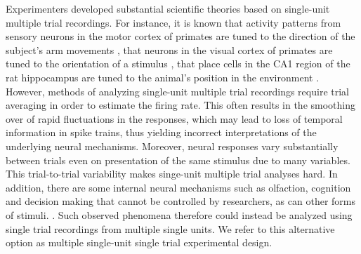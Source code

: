 Experimenters developed substantial scientific theories based on single-unit 
multiple trial recordings. For instance, it is known that activity patterns from sensory neurons in the motor cortex of primates are tuned to the direction of the subject's arm movements \cite{Georgopoulos1982}, that neurons in the visual cortex of primates are tuned to the orientation of a stimulus \cite{Hubel1968}, that place cells in the CA1 region of the rat hippocampus are tuned to the animal's position in the environment \cite{OKeefe1971}. However, methods of analyzing single-unit multiple trial recordings require trial averaging in order to estimate the firing rate. This often results in the smoothing over of rapid fluctuations in the responses, which may lead to loss of temporal information in spike trains, thus yielding incorrect interpretations of the underlying neural mechanisms. Moreover, neural responses vary substantially between trials even on presentation of the same stimulus due to many variables.
This trial-to-trial variability makes singe-unit multiple trial analyses hard.
In addition, there are some internal neural mechanisms such as olfaction, cognition and decision making that cannot be controlled by researchers, as can other forms of stimuli. \cite{Hopfield1995,Redish2016,Vos2015, Kaufman2014, Mazor2005}. Such observed phenomena therefore could instead be analyzed using single trial recordings from multiple single units. We refer to this alternative option as multiple single-unit single trial experimental design.


